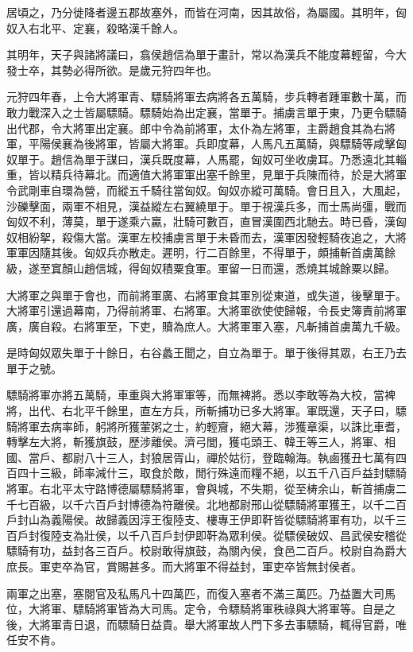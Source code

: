 居頃之，乃分徙降者邊五郡故塞外，而皆在河南，因其故俗，為屬國。其明年，匈奴入右北平、定襄，殺略漢千餘人。

其明年，天子與諸將議曰，翕侯趙信為單于畫計，常以為漢兵不能度幕輕留，今大發士卒，其勢必得所欲。是歲元狩四年也。

元狩四年春，上令大將軍青、驃騎將軍去病將各五萬騎，步兵轉者踵軍數十萬，而敢力戰深入之士皆屬驃騎。驃騎始為出定襄，當單于。捕虜言單于東，乃更令驃騎出代郡，令大將軍出定襄。郎中令為前將軍，太仆為左將軍，主爵趙食其為右將軍，平陽侯襄為後將軍，皆屬大將軍。兵即度幕，人馬凡五萬騎，與驃騎等咸擊匈奴單于。趙信為單于謀曰，漢兵既度幕，人馬罷，匈奴可坐收虜耳。乃悉遠北其輜重，皆以精兵待幕北。而適值大將軍軍出塞千餘里，見單于兵陳而待，於是大將軍令武剛車自環為營，而縱五千騎往當匈奴。匈奴亦縱可萬騎。會日且入，大風起，沙礫擊面，兩軍不相見，漢益縱左右翼繞單于。單于視漢兵多，而士馬尚彊，戰而匈奴不利，薄莫，單于遂乘六驘，壯騎可數百，直冒漢圍西北馳去。時已昏，漢匈奴相紛挐，殺傷大當。漢軍左校捕虜言單于未昏而去，漢軍因發輕騎夜追之，大將軍軍因隨其後。匈奴兵亦散走。遲明，行二百餘里，不得單于，頗捕斬首虜萬餘級，遂至窴顏山趙信城，得匈奴積粟食軍。軍留一日而還，悉燒其城餘粟以歸。

大將軍之與單于會也，而前將軍廣、右將軍食其軍別從東道，或失道，後擊單于。大將軍引還過幕南，乃得前將軍、右將軍。大將軍欲使使歸報，令長史簿責前將軍廣，廣自殺。右將軍至，下吏，贖為庶人。大將軍軍入塞，凡斬捕首虜萬九千級。

是時匈奴眾失單于十餘日，右谷蠡王聞之，自立為單于。單于後得其眾，右王乃去單于之號。

驃騎將軍亦將五萬騎，車重與大將軍軍等，而無裨將。悉以李敢等為大校，當裨將，出代、右北平千餘里，直左方兵，所斬捕功已多大將軍。軍既還，天子曰，驃騎將軍去病率師，躬將所獲葷粥之士，約輕齎，絕大幕，涉獲章渠，以誅比車耆，轉擊左大將，斬獲旗鼓，歷涉離侯。濟弓閭，獲屯頭王、韓王等三人，將軍、相國、當戶、都尉八十三人，封狼居胥山，禪於姑衍，登臨翰海。執鹵獲丑七萬有四百四十三級，師率減什三，取食於敵，閒行殊遠而糧不絕，以五千八百戶益封驃騎將軍。右北平太守路博德屬驃騎將軍，會與城，不失期，從至梼余山，斬首捕虜二千七百級，以千六百戶封博德為符離侯。北地都尉邢山從驃騎將軍獲王，以千二百戶封山為義陽侯。故歸義因淳王復陸支、樓專王伊即靬皆從驃騎將軍有功，以千三百戶封復陸支為壯侯，以千八百戶封伊即靬為眾利侯。從驃侯破奴、昌武侯安稽從驃騎有功，益封各三百戶。校尉敢得旗鼓，為關內侯，食邑二百戶。校尉自為爵大庶長。軍吏卒為官，賞賜甚多。而大將軍不得益封，軍吏卒皆無封侯者。

兩軍之出塞，塞閱官及私馬凡十四萬匹，而復入塞者不滿三萬匹。乃益置大司馬位，大將軍、驃騎將軍皆為大司馬。定令，令驃騎將軍秩祿與大將軍等。自是之後，大將軍青日退，而驃騎日益貴。舉大將軍故人門下多去事驃騎，輒得官爵，唯任安不肯。

